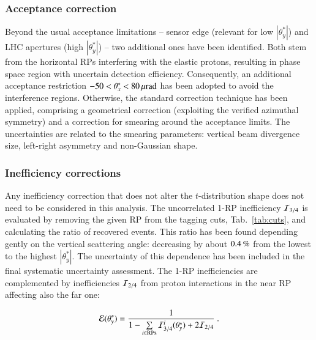 


\subsubsection{Acceptance correction}

Beyond the usual acceptance limitations -- sensor edge (relevant for low $|\theta^*_y|$) and LHC apertures (high $|\theta_y^*|$) -- two additional ones have been identified. Both stem from the horizontal RPs interfering with the elastic protons, resulting in phase space region with uncertain detection efficiency. Consequently, an additional acceptance restriction $-50 < \theta_x^* < 80\,{\rm \mu rad}$ has been adopted to avoid the interference regions. Otherwise, the standard correction technique \cite{8tev-90m} has been applied, comprising a geometrical correction (exploiting the verified azimuthal symmetry) and a correction for smearing around the acceptance limits. The uncertainties are related to the smearing parameters: vertical beam divergence size, left-right asymmetry and non-Gaussian shape.



\subsubsection{Inefficiency corrections}

Any inefficiency correction that does not alter the $t$-distribution shape does not need to be considered in this analysis. The uncorrelated 1-RP inefficiency ${\cal I}_{3/4}$ is evaluated by removing the given RP from the tagging cuts, Tab.~\ref{tab:cuts}, and calculating the ratio of recovered events. This ratio has been found depending gently on the vertical scattering angle: decreasing by about $0.4\,{\rm \%}$ from the lowest to the highest $|\theta_y^*|$. The uncertainty of this dependence has been included in the final systematic uncertainty assessment. The 1-RP inefficiencies are complemented by inefficiencies ${\cal I}_{2/4}$ from proton interactions in the near RP affecting also the far one:

\begin{equation}
\label{efficiency}
	{\cal E}(\theta_y^*) = {1\over 1 - \sum\limits_{i\in \rm RPs} {\cal I}^i_{3/4}(\theta_y^*) + 2 {\cal I}_{2/4} } \ .
\end{equation}

